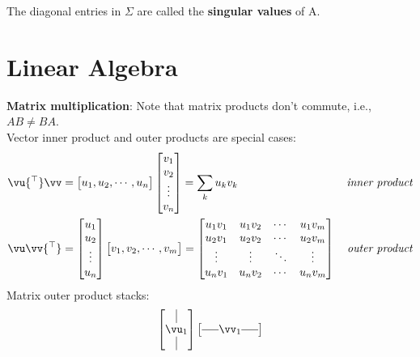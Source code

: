 \documentclass[a4paper,11pt]{exam}
\newcounter{ct}
\newcommand{\horzbar}{\rule[.5ex]{1.5em}{0.4pt}}
\newcommand{\trp}{{^\top}} %
\begin{document}
\begin{questions}
The diagonal entries in $\Sigma$ are called the \textbf{singular values} of A.

\section{Linear Algebra}
\begin{tcolorbox}[colback=black!1!,title=Matrix Fun Facts]
\textbf{Matrix multiplication}:
\noindent
Note that matrix products don't commute, i.e., $AB \neq BA$.\\[1mm]
Vector inner product and outer products are special cases:
\begin{align}
    \vu\trp \vv &=
    \begin{bmatrix}
	u_1, u_2, \cdots, u_n
    \end{bmatrix}
    \begin{bmatrix}
	v_1\\v_2\\\vdots\\ v_n
    \end{bmatrix}
    =
    \sum_k u_k v_k
    \,&
    \text{\emph{inner product}}
    \\
    \vu \vv\trp &=
    \begin{bmatrix}
	u_1\\u_2\\\vdots\\ u_n
    \end{bmatrix}
    \begin{bmatrix}
	v_1, v_2, \cdots, v_m
    \end{bmatrix}
    =
    \begin{bmatrix}
	u_1 v_1 & u_1 v_2 & \cdots & u_1 v_m
	\\
	u_2 v_1 & u_2 v_2 & \cdots & u_2 v_m
	\\
	\vdots & \vdots & \ddots & \vdots
	\\
	u_n v_1 & u_n v_2 & \cdots & u_n v_m
    \end{bmatrix}
    \,&
    \text{\emph{outer product}}
\end{align}
Matrix outer product stacks:
\begin{align}
    \begin{bmatrix}
	\kern.3em\vline\kern.3em \\
	\vu_1 \\
	\kern.3em\vline\kern.3em
    \end{bmatrix}
    \begin{bmatrix}
	\horzbar \vv_1 \horzbar
    \end{bmatrix}

\end{align}
\end{tcolorbox}
\end{questions}
\end{document}
